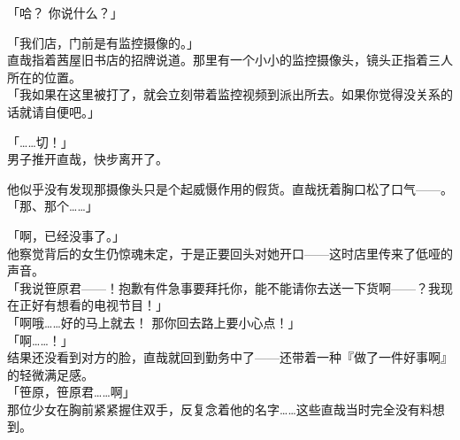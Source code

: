 「哈？ 你说什么？」

「我们店，门前是有监控摄像的。」\\

直哉指着茜屋旧书店的招牌说道。那里有一个小小的监控摄像头，镜头正指着三人所在的位置。\\

「我如果在这里被打了，就会立刻带着监控视频到派出所去。如果你觉得没关系的话就请自便吧。」

「……切！」\\

男子推开直哉，快步离开了。

他似乎没有发现那摄像头只是个起威慑作用的假货。直哉抚着胸口松了口气——。\\

「那、那个……」

「啊，已经没事了。」\\

他察觉背后的女生仍惊魂未定，于是正要回头对她开口——这时店里传来了低哑的声音。\\

「我说笹原君——！抱歉有件急事要拜托你，能不能请你去送一下货啊——？我现在正好有想看的电视节目！」\\

「啊哦……好的马上就去！ 那你回去路上要小心点！」\\

「啊……！」\\

结果还没看到对方的脸，直哉就回到勤务中了——还带着一种『做了一件好事啊』的轻微满足感。\\

「笹原，笹原君……啊」\\

那位少女在胸前紧紧握住双手，反复念着他的名字……这些直哉当时完全没有料想到。\\
